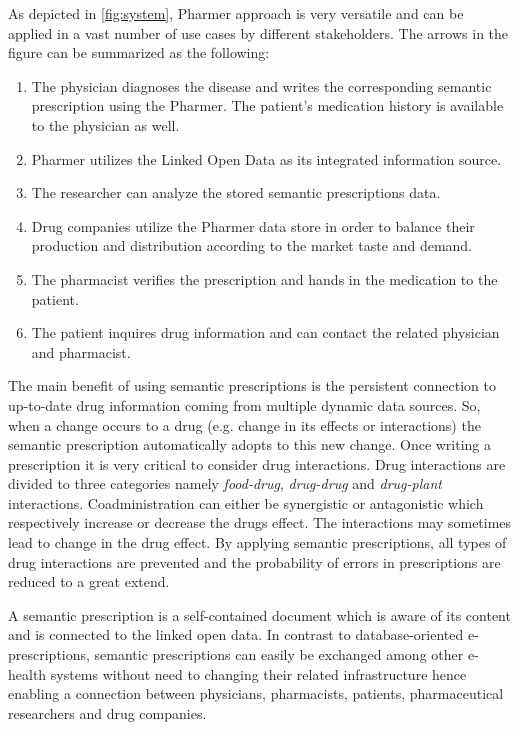 \documentclass[conference]{IEEEtran}
\begin{document}
As depicted in \autoref{fig:system}, Pharmer approach is very versatile and can be applied in a vast number of use cases by different stakeholders. The arrows in the figure can be summarized as the following:

\begin{enumerate}
\item The physician diagnoses the disease and writes the corresponding semantic prescription using the Pharmer. The patient's medication history is available to the physician as well.
\item Pharmer utilizes the Linked Open Data as its integrated information source.
\item The researcher can analyze the stored semantic prescriptions data.
\item Drug companies utilize the Pharmer data store in order to balance their production and distribution according to the market taste and demand.
\item The pharmacist verifies the prescription and hands in the medication to the patient.
\item The patient inquires drug information and can contact the related physician and pharmacist.
\end{enumerate}

The main benefit of using semantic prescriptions is the persistent connection to up-to-date drug information coming from multiple dynamic data sources.
So, when a change occurs to a drug (e.g. change in its effects or interactions) the semantic prescription automatically adopts to this new change.
Once writing a prescription it is very critical to consider drug interactions.
Drug interactions are divided to three categories namely \emph{food-drug}, \emph{drug-drug} and \emph{drug-plant} interactions.
Coadministration can either be synergistic or antagonistic which respectively increase or decrease the drugs effect.
The interactions may sometimes lead to change in the drug effect.
By applying semantic prescriptions, all types of drug interactions are prevented and the probability of errors in prescriptions are reduced to a great extend.

A semantic prescription is a self-contained document which is aware of its content and is connected to the linked open data.
In contrast to database-oriented e-prescriptions, semantic prescriptions can easily be exchanged among other e-health systems without need to changing their related infrastructure hence enabling a connection between physicians, pharmacists, patients, pharmaceutical researchers and drug companies.
\end{document}
